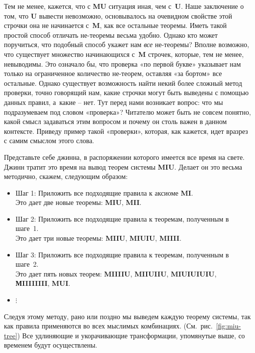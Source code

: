 \documentclass[../main.tex]{subfiles}
\begin{document}
Тем не менее, кажется, что с \textbf{MU} ситуация иная, чем с~\textbf{U}. Наше заключение о том, что \textbf{U} вывести невозможно, основывалось на очевидном свойстве этой строчки она не начинается с~\textbf{M}, как все остальные теоремы. Иметь такой простой способ отличать не-теоремы весьма удобно. Однако кто может поручиться, что подобный способ укажет нам \emph{все} не-теоремы? Вполне возможно, что существует множество начинающихся с~\textbf{M} строчек, которые, тем не менее, невыводимы. Это означало бы, что проверка «по первой букве» указывает нам только на ограниченное количество не-теорем, оставляя «за бортом» все остальные. Однако существует возможность найти некий более сложный метод проверки, точно говорящий нам, какие строчки могут быть выведены с помощью данных правил, а~какие \--- нет. Тут перед нами возникает вопрос: что мы подразумеваем под словом «проверка»? Читателю может быть не совсем понятно, какой смысл задаваться этим вопросом и почему он столь важен в данном контексте. Приведу пример такой «проверки», которая, как кажется, идет вразрез с самим смыслом этого слова.

Представьте себе джинна, в распоряжении которого имеется все время на свете. Джинн тратит это время на вывод теорем системы \textbf{MIU}. Делает он это весьма методично, скажем, следующим образом:

\begin{itemize}[
    noitemsep,
    topsep=4pt,
    label={},
    leftmargin=\parindent,
]
    \item Шаг 1: Приложить все подходящие правила к аксиоме \textbf{MI}. \\
    Это дает две новые теоремы: \textbf{MIU}, \textbf{MII}.

    \item Шаг 2: Приложить все подходящие правила к теоремам, полученным в шаге~1. \\
    Это дает три новые теоремы: \textbf{MIIU}, \textbf{MIUIU}, \textbf{MIIII}.

    \item Шаг 3: Приложить все подходящие правила к теоремам, полученным в шаге~2. \\
    Это дает пять новых теорем: \textbf{MIIIIU}, \textbf{MIIUIIU}, \textbf{MIUIUIUIU}, \textbf{МIIIIIIII}, \textbf{MUI}.

    \item \quad$\bm{\vdots}$
\end{itemize}

Следуя этому методу, рано или поздно мы выведем каждую теорему системы, так как правила применяются во всех мыслимых комбинациях. (См.~рис.~\ref{fig:miu-tree})
Все удлиняющие и укорачивающие трансформации, упомянутые выше, со временем будут осуществлены.
\end{document}
